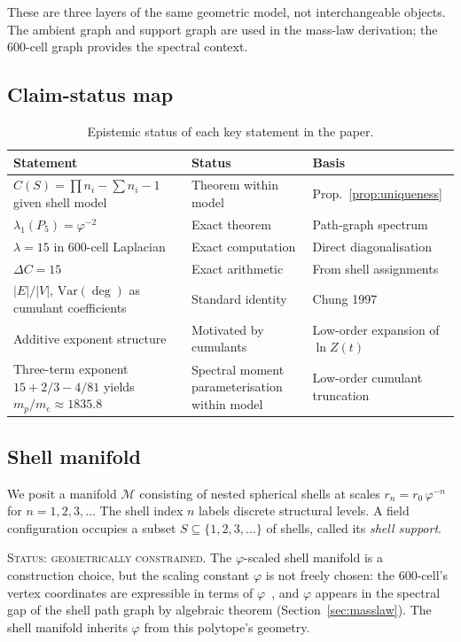 \documentclass[12pt]{article}
\newcommand{\phig}{\varphi}
\begin{document}
These are three layers of the same geometric model, not interchangeable objects. The ambient graph and support graph are used in the mass-law derivation; the 600-cell graph provides the spectral context.

\subsection{Claim-status map}

\begin{table}[ht]
\centering
\caption{Epistemic status of each key statement in the paper.}
\label{tab:claimmap}
\begin{tabular}{@{}lll@{}}
\toprule
Statement & Status & Basis \\
\midrule
$C(S) = \prod n_i - \sum n_i - 1$ given shell model & Theorem within model & Prop.~\ref{prop:uniqueness} \\
$\lambda_1(P_5) = \phig^{-2}$ & Exact theorem & Path-graph spectrum \\
$\lambda = 15$ in 600-cell Laplacian & Exact computation & Direct diagonalisation \\
$\Delta C = 15$ & Exact arithmetic & From shell assignments \\
$|E|/|V|$, $\mathrm{Var}(\deg)$ as cumulant coefficients & Standard identity & Chung 1997 \\
Additive exponent structure & Motivated by cumulants & Low-order expansion of $\ln Z(t)$ \\
Three-term exponent $15 + 2/3 - 4/81$ yields $m_p/m_e \approx 1835.8$ & Spectral moment parameterisation within model & Low-order cumulant truncation \\
\bottomrule
\end{tabular}
\end{table}

\subsection{Shell manifold}

We posit a manifold $\mathcal{M}$ consisting of nested spherical shells at scales $r_n = r_0\, \phig^{-n}$ for $n = 1, 2, 3, \ldots$ The shell index $n$ labels discrete structural levels. A field configuration occupies a subset $S \subseteq \{1, 2, 3, \ldots\}$ of shells, called its \textit{shell support}.

\textsc{Status: geometrically constrained.} The $\phig$-scaled shell manifold is a construction choice, but the scaling constant $\phig$ is not freely chosen: the 600-cell's vertex coordinates are expressible in terms of $\phig$~\citep{Coxeter1973}, and $\phig$ appears in the spectral gap of the shell path graph by algebraic theorem (Section~\ref{sec:masslaw}). The shell manifold inherits $\phig$ from this polytope's geometry.
\end{document}
